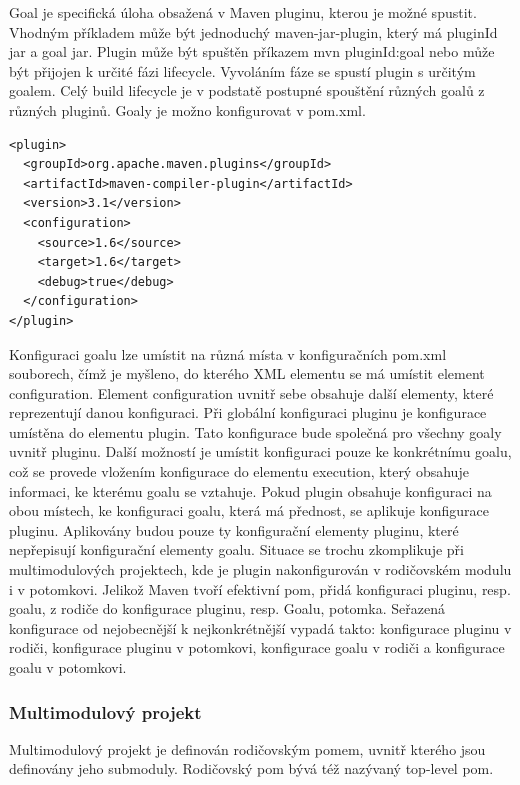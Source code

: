 \documentclass[11pt,twoside,a4paper]{book}
\begin{document}
Goal je specifická úloha obsažená v Maven pluginu, kterou je možné spustit. Vhodným
příkladem může být jednoduchý maven-jar-plugin, který má pluginId jar a goal jar. Plugin
může být spuštěn příkazem mvn pluginId:goal nebo může být přijojen k určité fázi lifecycle.
Vyvoláním fáze se spustí plugin s určitým goalem. Celý build lifecycle je v podstatě postupné
spouštění různých goalů z různých pluginů. Goaly je možno konfigurovat v pom.xml.

\begin{lstlisting}[frame=single]
<plugin>
  <groupId>org.apache.maven.plugins</groupId>
  <artifactId>maven-compiler-plugin</artifactId>
  <version>3.1</version>
  <configuration>
    <source>1.6</source>
    <target>1.6</target>
    <debug>true</debug>
  </configuration>
</plugin>
\end{lstlisting}

Konfiguraci goalu lze umístit na různá místa v konfiguračních pom.xml souborech, čímž je
myšleno, do kterého XML elementu se má umístit element configuration. Element
configuration uvnitř sebe obsahuje další elementy, které reprezentují danou konfiguraci. Při
globální konfiguraci pluginu je konfigurace umístěna do elementu plugin. Tato konfigurace
bude společná pro všechny goaly uvnitř pluginu. Další možností je umístit konfiguraci pouze
ke konkrétnímu goalu, což se provede vložením konfigurace do elementu execution, který
obsahuje informaci, ke kterému goalu se vztahuje. Pokud plugin obsahuje konfiguraci na
obou místech, ke konfiguraci goalu, která má přednost, se aplikuje konfigurace pluginu.
Aplikovány budou pouze ty konfigurační elementy pluginu, které nepřepisují konfigurační
elementy goalu. Situace se trochu zkomplikuje při multimodulových projektech, kde je plugin
nakonfigurován v rodičovském modulu i v potomkovi. Jelikož Maven tvoří efektivní pom,
přidá konfiguraci pluginu, resp. goalu, z rodiče do konfigurace pluginu, resp. Goalu, potomka.
Seřazená konfigurace od nejobecnější k nejkonkrétnější vypadá takto: konfigurace pluginu v
rodiči, konfigurace pluginu v potomkovi, konfigurace goalu v rodiči a konfigurace goalu v
potomkovi.

\subsubsection{Multimodulový projekt}

Multimodulový projekt je definován rodičovským pomem, uvnitř kterého jsou definovány
jeho submoduly. Rodičovský pom bývá též nazývaný top-level pom.
\end{document}
